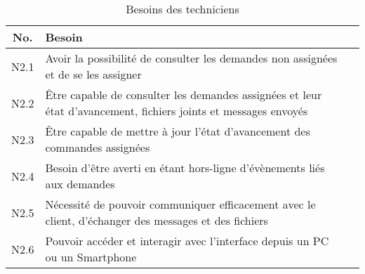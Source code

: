 \documentclass[
    iai, %
    eai, %
]{heig-tb}
\begin{document}
\begin{table}[h]
  \begin{center}
    \caption{Besoins des techniciens \label{specification}}
    \begin{tabularx}{\textwidth}{cXc}
      No.  & Besoin                                                                                                          \\ \toprule
      N2.1 & Avoir la possibilité de consulter les demandes non assignées et de se les assigner                              \\ \midrule
      N2.2 & Être capable de consulter les demandes assignées et leur état d'avancement, fichiers joints et messages envoyés \\ \midrule
      N2.3 & Être capable de mettre à jour l'état d'avancement des commandes assignées                                       \\ \midrule
      N2.4 & Besoin d'être averti en étant hors-ligne d'évènements liés aux demandes                                         \\ \midrule
      N2.5 & Nécessité de pouvoir communiquer efficacement avec le client, d'échanger des messages et des fichiers           \\ \midrule
      N2.6 & Pouvoir accéder et interagir avec l'interface depuis un PC ou un Smartphone                                     \\ \midrule
    \end{tabularx}
  \end{center}
\end{table}
\end{document}
